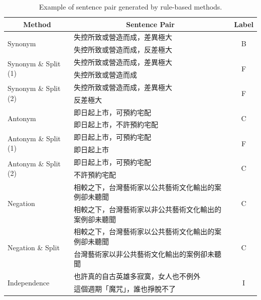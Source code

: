 \documentclass[12pt]{article}
\begin{document}
\begin{CJK*}{UTF8}{bkai}
\begin{spacing}{1.77}
\begin{table}[H]
  \centering
  \setlength{\extrarowheight}{-3pt}
  \begin{tabular}{|l|l|c|}
    \hline
    \multicolumn{1}{|c|}{Method} & \multicolumn{1}{c|}{Sentence Pair} & Label \\ \hline
    \multirow{2}{*}{Synonym} & 失控所致或營造而成，差異極大 & \multirow{2}{*}{B} \\ \cline{2-2}
    & 失控所致或營造而成，反差極大 &  \\ \hline
    \multirow{2}{*}{Synonym \& Split (1)} & 失控所致或營造而成，差異極大 & \multirow{2}{*}{F} \\ \cline{2-2}
    & 失控所致或營造而成 &  \\ \hline
    \multirow{2}{*}{Synonym \& Split (2)} & 失控所致或營造而成，差異極大 & \multirow{2}{*}{F} \\ \cline{2-2}
    & 反差極大 &  \\ \hline
    \multirow{2}{*}{Antonym} & 即日起上市，可預約宅配 & \multirow{2}{*}{C} \\ \cline{2-2}
    & 即日起上市，不許預約宅配 &  \\ \hline
    \multirow{2}{*}{Antonym \& Split (1)} & 即日起上市，可預約宅配 & \multirow{2}{*}{F} \\ \cline{2-2}
    & 即日起上市 &  \\ \hline
    \multirow{2}{*}{Antonym \& Split (2)} & 即日起上市，可預約宅配 & \multirow{2}{*}{C} \\ \cline{2-2}
    & 不許預約宅配 &  \\ \hline
    \multirow{2}{*}{Negation} & 相較之下，台灣藝術家以公共藝術文化輸出的案例卻未聽聞 & \multirow{2}{*}{C} \\ \cline{2-2}
    & 相較之下，台灣藝術家以非公共藝術文化輸出的案例卻未聽聞 &  \\ \hline
    \multirow{2}{*}{Negation \& Split} & 相較之下，台灣藝術家以公共藝術文化輸出的案例卻未聽聞 & \multirow{2}{*}{C} \\ \cline{2-2}
    & 台灣藝術家以非公共藝術文化輸出的案例卻未聽聞 &  \\ \hline
    \multirow{2}{*}{Independence} & 也許真的自古英雄多寂寞，女人也不例外 & \multirow{2}{*}{I} \\ \cline{2-2}
    & 這個週期「魔咒」，誰也掙脫不了 &  \\ \hline
  \end{tabular}
  \caption{Example of sentence pair generated by rule-based methods.}
  \label{example:sim_nli_rule_based}
\end{table}


\end{spacing}
\end{CJK*}
\end{document}

